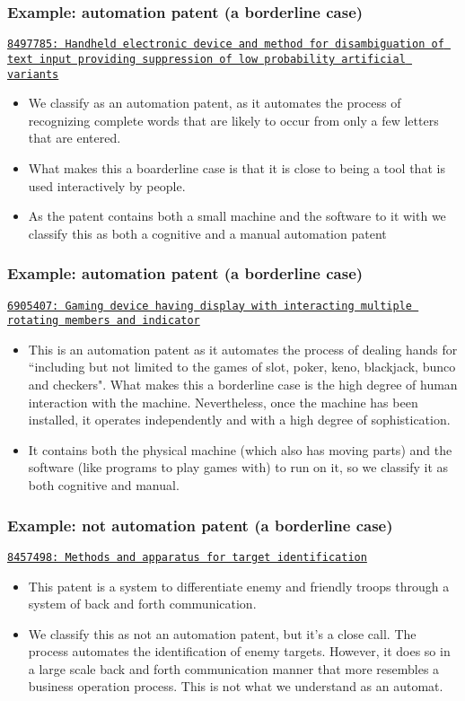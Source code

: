\documentclass[10pt]{beamer}
\begin{document}
\begin{frame}\frametitle{Example: automation patent (a borderline case)}
\href{https://www.google.de/patents/US8497785?dq=8497785&hl=en&sa=X&ei=2O5RVYD3L4GWsAGt0oCgCA&ved=0CCEQ6AEwAA}{\texttt{8497785: Handheld electronic device and method for disambiguation of text input providing suppression of low probability artificial variants}}
	\begin{itemize}	
	\item We classify as an automation patent, as it automates the process of recognizing complete words that are likely to occur from only a few letters that are entered.
	\item What makes this a boarderline case is that it is close to being a tool that is used interactively by people.
	\item As the patent contains both a small machine and the software to it with we classify this as both a cognitive and a manual automation patent
	\end{itemize}
\end{frame}


\begin{frame}\frametitle{Example: automation patent (a borderline case)}
\href{https://www.google.de/patents/US6905407?dq=6905407&hl=en&sa=X&ei=XfJRVYDIAYmosAGKx4CwCw&ved=0CCEQ6AEwAA}{\texttt{6905407: Gaming device having display with interacting multiple rotating members and indicator}}
	\begin{itemize}	
	\item This is an automation patent as it automates the process of dealing hands for ``including but not limited to the games of slot, poker, keno, blackjack, bunco and checkers". What makes this a borderline case is the high degree of human interaction with the machine. Nevertheless, once the machine has been installed, it operates independently and with a high degree of sophistication.
	\item It contains both the physical machine (which also has moving parts) and the software (like programs to play games with) to run on it, so we classify it as both cognitive and manual.
	\end{itemize}
\end{frame}


\begin{frame}\frametitle{Example:  \textbf{not} automation patent (a borderline case)}
\href{https://www.google.de/patents/US8457498?dq=8457498&hl=en&sa=X&ei=BgRSVYnsIMmdsgG_tYHQDQ&ved=0CCAQ6AEwAA}{\texttt{8457498: Methods and apparatus for target identification}}
	\begin{itemize}	
	\item This patent is a system to differentiate enemy and friendly troops through a system of back and forth communication. 
	\item We classify this as not an automation patent, but it's a close call. The process automates the identification of enemy targets. However, it does so in a large scale back and forth communication manner that more resembles a business operation process. This is not what we understand as an automat.
	\end{itemize}
\end{frame}
\end{document}
